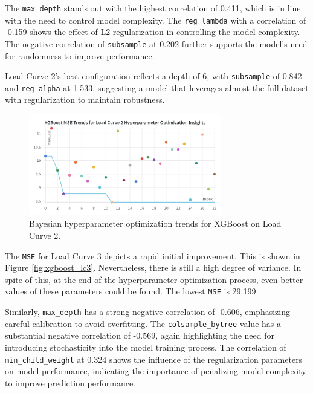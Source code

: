 \documentclass{article} %
\begin{document}
The \texttt{max\_depth} stands out with the highest correlation of 0.411, which is in line with the need to control model complexity. The \texttt{reg\_lambda} with a correlation of -0.159 shows the effect of L2 regularization in controlling the model complexity. The negative correlation of \texttt{subsample} at 0.202 further supports the model's need for randomness to improve performance.

Load Curve 2's best configuration reflects a depth of 6, with \texttt{subsample} of 0.842 and \texttt{reg\_alpha} at 1.533, suggesting a model that leverages almost the full dataset with regularization to maintain robustness.
\begin{figure}[H]
    \centering
    \includegraphics[width=0.75\textwidth]{ressources/Hyperparams/XGBoost/XGBoost MSE Trends for Load Curve 2 Hyperparameter Optimization Insights.png}
    \caption{Bayesian hyperparameter optimization trends for XGBoost on Load Curve 2.}
    \label{fig:xgboost_lc2}
\end{figure}
The \texttt{MSE} for Load Curve 3 depicts a rapid initial improvement. This is shown in Figure \ref{fig:xgboost_lc3}. Nevertheless, there is still a high degree of variance. In spite of this, at the end of the hyperparameter optimization process, even better values of these parameters could be found. The lowest \texttt{MSE} is 29.199.

Similarly, \texttt{max\_depth} has a strong negative correlation of -0.606, emphasizing careful calibration to avoid overfitting. The \texttt{colsample\_bytree} value has a substantial negative correlation of -0.569, again highlighting the need for introducing stochasticity into the model training process. The correlation of \texttt{min\_child\_weight} at 0.324 shows the influence of the regularization parameters on model performance, indicating the importance of penalizing model complexity to improve prediction performance.
\end{document}
